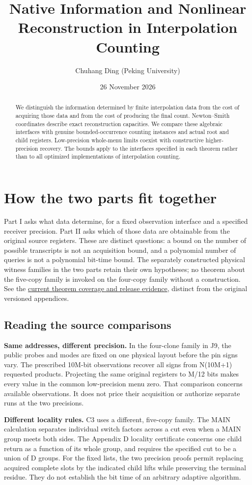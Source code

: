 \documentclass[11pt,a4paper]{article}
\title{Native Information and Nonlinear Reconstruction in Interpolation Counting\SubtitleForOfflineBuild{Exact Decoder Capacities, Native Interfaces, and Escape Mechanisms}}
\author{Chuhang Ding (Peking University)}
\date{26 November 2026}
\begin{document}
\maketitle
\begin{abstract}
We distinguish the information determined by finite interpolation data from
the cost of acquiring those data and from the cost of producing the final
count. Newton--Smith coordinates describe exact reconstruction capacities.
We compare these algebraic interfaces with genuine bounded-occurrence
counting instances and actual root and child registers. Low-precision
whole-menu limits coexist with constructive higher-precision recovery.
The bounds apply to the interfaces specified in each theorem rather than
to all optimized implementations of interpolation counting.
\end{abstract}
\tableofcontents
\section*{How the two parts fit together}
Part I asks what data determine, for a fixed observation interface and a
specified receiver precision. Part II asks which of those data are
obtainable from the original source registers. These are distinct questions:
a bound on the number of possible transcripts is not an acquisition bound,
and a polynomial number of queries is not a polynomial bit-time bound.
The separately constructed physical witness families in the two parts
retain their own hypotheses; no theorem about the five-copy family is
invoked on the four-copy family without a construction.
See the \hyperref[paper6-current-coverage]{current theorem coverage and
release evidence}, distinct from the original versioned appendices.
\subsection*{Reading the source comparisons}
\textbf{Same addresses, different precision.} In the four-clone family in J9, the public probes and modes are fixed on one
physical layout before the pin signs vary. The prescribed 10M-bit observations
recover all signs from N(10M+1) requested products. Projecting the same
original registers to M/12 bits makes every value in the common low-precision
menu zero. That comparison concerns available observations. It does not price
their acquisition or authorize separate runs at the two precisions.

\textbf{Different locality rules.} C3 uses a different, five-copy family. The MAIN calculation separates
individual switch factors across a cut even when a MAIN group meets both
sides. The Appendix D locality certificate concerns one child return as a
function of its whole group, and requires the specified cut to be a union of D
groups. For the fixed lists, the two precision proofs permit replacing
acquired complete slots by the indicated child lifts while preserving the
terminal residue. They do not establish the bit time of an arbitrary adaptive
algorithm.
\end{document}
